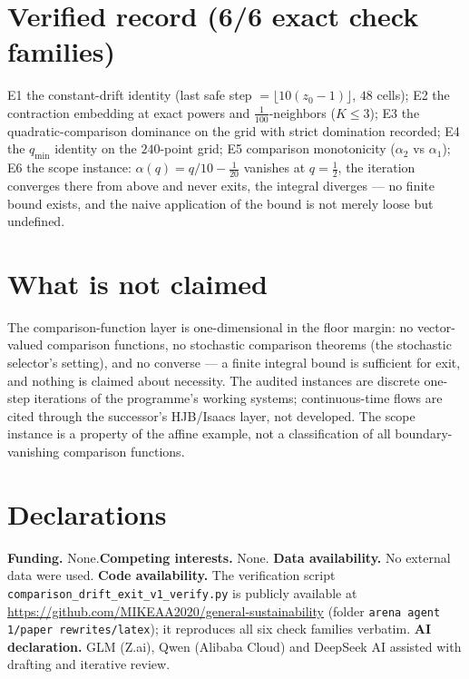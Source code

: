 \documentclass[10pt,twocolumn]{article}
\theoremstyle{definition}
\begin{document}
\section{Verified record (6/6 exact check families)}

E1 the constant-drift identity (last safe step $=\lfloor10(z_0-1)\rfloor$,
$48$ cells); E2 the contraction embedding at exact powers and
$\tfrac1{100}$-neighbors ($K\le3$); E3 the quadratic-comparison dominance
on the grid with strict domination recorded; E4 the $q_{\min}$ identity on
the $240$-point grid; E5 comparison monotonicity ($\alpha_2$ vs
$\alpha_1$); E6 the scope instance: $\alpha(q)=q/10-\tfrac1{20}$ vanishes
at $q=\tfrac12$, the iteration converges there from above and never
exits, the integral diverges --- no finite bound exists, and the naive
application of the bound is not merely loose but undefined.

\section{What is not claimed}

The comparison-function layer is one-dimensional in the floor margin: no
vector-valued comparison functions, no stochastic comparison theorems (the
stochastic selector's setting), and no converse --- a finite integral bound
is sufficient for exit, and nothing is claimed about necessity. The
audited instances are discrete one-step iterations of the programme's
working systems; continuous-time flows are cited through the successor's
HJB/Isaacs layer, not developed. The scope instance is a property of the
affine example, not a classification of all boundary-vanishing comparison
functions.


\section*{Declarations}
\textbf{Funding.} None.\quad \textbf{Competing interests.} None.\quad
\textbf{Data availability.} No external data were used.\quad
\textbf{Code availability.} The verification script
\texttt{comparison\_drift\_exit\_v1\_verify.py} is publicly available at
\url{https://github.com/MIKEAA2020/general-sustainability} (folder
\texttt{arena agent 1/paper rewrites/latex}); it reproduces all six check
families verbatim.\quad
\textbf{AI declaration.} GLM (Z.ai), Qwen (Alibaba Cloud) and DeepSeek AI
assisted with drafting and iterative review.
\end{document}
